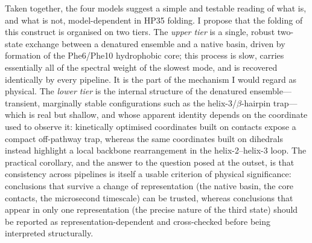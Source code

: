 \documentclass[prl,twocolumn]{revtex4-1}
\begin{document}
Taken together, the four models suggest a simple and testable reading of
what is, and what is not, model-dependent in HP35 folding. I propose that
the folding of this construct is organised on two tiers. The
\emph{upper tier} is a single, robust two-state exchange between a
denatured ensemble and a native basin, driven by formation of the
Phe6/Phe10 hydrophobic core; this process is slow, carries essentially
all of the spectral weight of the slowest mode, and is recovered
identically by every pipeline. It is the part of the mechanism I would
regard as physical. The \emph{lower tier} is the internal structure of
the denatured ensemble---transient, marginally stable configurations
such as the helix-3/$\beta$-hairpin trap---which is real but shallow, and
whose apparent identity depends on the coordinate used to observe it:
kinetically optimised coordinates built on contacts expose a compact
off-pathway trap, whereas the same coordinates built on dihedrals instead
highlight a local backbone rearrangement in the helix-2--helix-3 loop.
The practical corollary, and the answer to the question posed at the
outset, is that consistency across pipelines is itself a usable criterion
of physical significance: conclusions that survive a change of
representation (the native basin, the core contacts, the microsecond
timescale) can be trusted, whereas conclusions that appear in only one
representation (the precise nature of the third state) should be reported
as representation-dependent and cross-checked before being interpreted
structurally.
%
%
%
\end{document}
